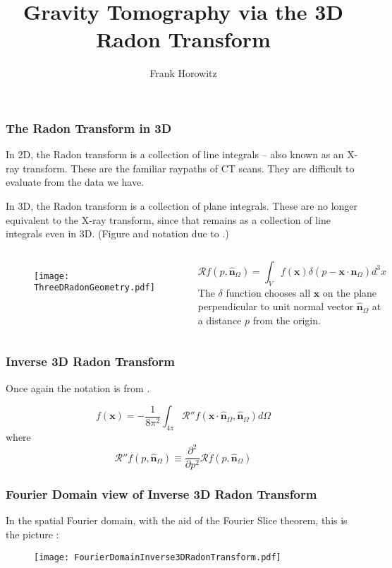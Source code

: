 \documentclass[aspectratio=43,serif,9pt]{beamer}
\title[Gravitational Tomography]{Gravity Tomography via the 3D Radon Transform } %
\author{Frank Horowitz} %
\institute[INSTOC/Cornell] %
{
INSTOC, Cornell University\\ %
\medskip
\textit{frank@horow.net} %
}
\date{} %
\newcommand{\Rad}{\mathcal{R}}
\newcommand{\vect}[1]{\boldsymbol{#1}}
\begin{document}
\begin{frame}
  \titlepage %

\end{frame}

\begin{frame}
  \frametitle{The Radon Transform in 3D}
  In 2D, the Radon transform is a collection of line integrals -- also known as an X-ray transform. These are the familiar raypaths of CT scans. They are difficult to evaluate from the data we have.

  In 3D, the Radon transform is a collection of plane integrals. These are no longer equivalent to the X-ray transform, since that remains as a collection of line integrals even in 3D. (Figure and notation due to \cite{Bortfeld13}.)
\begin{columns}
  \begin{figure}
    \texttt{[image: ThreeDRadonGeometry.pdf]}
  \end{figure}
  \[ \Rad f(p,\hat{\vect{n}}_\Omega) = \int_V f(\vect{x}) \delta(p - \vect{x}\cdot\hat{\vect{n}}_\Omega) d^3x
  \]
  The $\delta$ function chooses all $\vect{x}$ on the plane perpendicular to unit normal vector $\hat{\vect{n}}_\Omega$ at a distance $p$ from the origin.
\end{columns}
\end{frame}

\begin{frame}
  \frametitle{Inverse 3D Radon Transform}

  Once again the notation is from \cite{Bortfeld13}.

  \[
    f(\vect{x}) = - \frac{1}{8 \pi^2} \int_{4 \pi} \Rad'' f(\vect{x}\cdot\hat{\vect{n}}_\Omega,\hat{\vect{n}}_\Omega) d\Omega
  \]
  where
  \[
    \Rad'' f(p,\hat{\vect{n}}_\Omega) \equiv \frac{\partial^2  }{\partial p^2} \Rad f(p,\hat{\vect{n}}_\Omega)
  \]

\end{frame}

\begin{frame}
  \frametitle{Fourier Domain view of Inverse 3D Radon Transform}
  In the spatial Fourier domain, with the aid of the Fourier Slice theorem, this is the picture \parencite[image is again due to][]{Bortfeld13}:
  \begin{figure}
    \texttt{[image: FourierDomainInverse3DRadonTransform.pdf]}
  \end{figure}
\end{frame}
\end{document}
